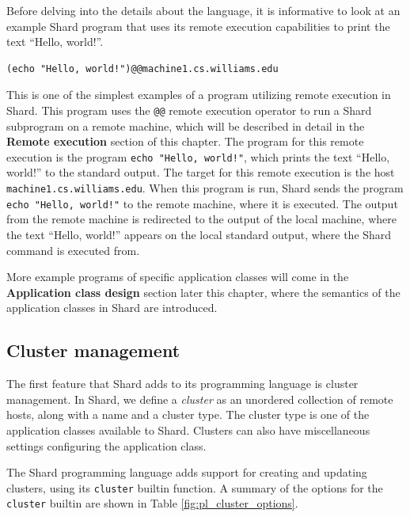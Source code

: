 \documentclass[oneside]{report}
\begin{document}
Before delving into the details about the language, it is informative to look at an example Shard program that uses its remote execution capabilities to print the text ``Hello, world!''.

\begin{minipage}[c]{\textwidth-15pt}
  \begin{lstlisting}[language=Shard]
(echo "Hello, world!")@@machine1.cs.williams.edu
\end{lstlisting}
  \smallskip
\end{minipage}

This is one of the simplest examples of a program utilizing remote execution in Shard.
This program uses the \texttt{@@} remote execution operator to run a Shard subprogram on a remote machine, which will be described in detail in the \textbf{Remote execution} section of this chapter.
The program for this remote execution is the program \texttt{echo "Hello, world!"}, which prints the text ``Hello, world!'' to the standard output.
The target for this remote execution is the host \texttt{machine1.cs.williams.edu}.
When this program is run, Shard sends the program \texttt{echo "Hello, world!"} to the remote machine, where it is executed.
The output from the remote machine is redirected to the output of the local machine, where the text ``Hello, world!'' appears on the local standard output, where the Shard command is executed from.

More example programs of specific application classes will come in the \textbf{Application class design} section later this chapter, where the semantics of the application classes in Shard are introduced.

\subsection{Cluster management}
The first feature that Shard adds to its programming language is cluster management.
In Shard, we define a \textit{cluster} as an unordered collection of remote hosts, along with a name and a cluster type.
The cluster type is one of the application classes available to Shard.
Clusters can also have miscellaneous settings configuring the application class.

The Shard programming language adds support for creating and updating clusters, using its \texttt{cluster} builtin function.
A summary of the options for the \texttt{cluster} builtin are shown in Table \ref{fig:pl_cluster_options}.
\end{document}
